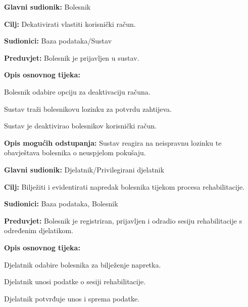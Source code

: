 \vspace{1em} %
\noindent{}
\begin{packed_item}
	\item \textbf{Glavni sudionik:} Bolesnik
	\item \textbf{Cilj:} Dekativirati vlastiti korisnički račun.
	\item \textbf{Sudionici:} Baza podataka/Sustav
	\item \textbf{Preduvjet:} Bolesnik je prijavljen u sustav.
	\item \textbf{Opis osnovnog tijeka:}
	\begin{packed_enum}
		\item Bolesnik odabire opciju za deaktivaciju računa.
		\item Sustav traži bolesnikovu lozinku za potvrdu zahtijeva.
		\item Sustav je deaktivirao bolesnikov korisnički račun.
	\end{packed_enum}
	\item \textbf{Opis mogućih odstupanja:}
	Sustav reagira na neispravnu lozinku te obavještava bolesnika o neuspjelom pokušaju.
\end{packed_item}

\vspace{1em} %
\noindent{}
\begin{packed_item}
	\item \textbf{Glavni sudionik:} Djelatnik/Privilegirani djelatnik
	\item \textbf{Cilj:} Bilježiti i evidentirati napredak bolesnika tijekom procesa rehabilitacije.
	\item \textbf{Sudionici:} Baza podataka, Bolesnik
	\item \textbf{Preduvjet:} Bolesnik je registriran, prijavljen i odradio sesiju rehabilitacije s određenim djelatikom.
	\item \textbf{Opis osnovnog tijeka:}
	\begin{packed_enum}
		\item Djelatnik odabire bolesnika za bilježenje napretka.
		\item Djelatnik unosi podatke o sesiji rehabilitacije.
		\item Djelatnik potvrđuje unos i sprema podatke.
	\end{packed_enum}
\end{packed_item}

